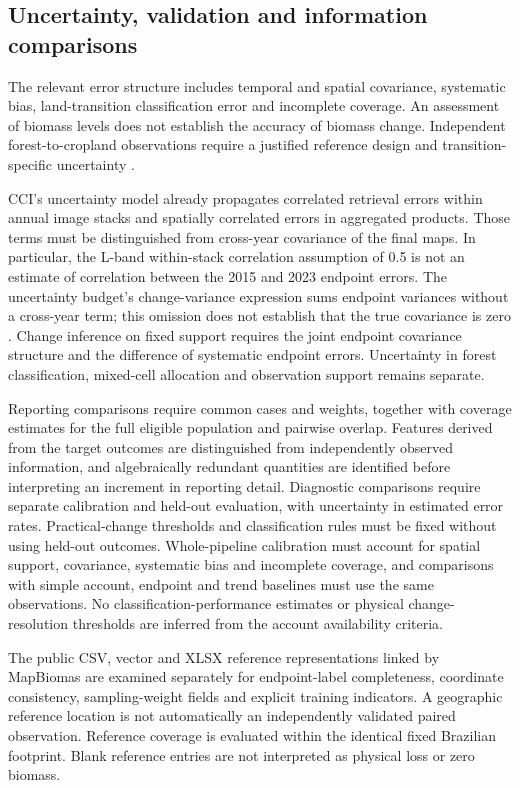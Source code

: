 \documentclass[11pt,a4paper]{article}
\begin{document}
\subsection{Uncertainty, validation and information comparisons}
The relevant error structure includes temporal and spatial covariance, systematic bias, land-transition classification error and incomplete coverage. An assessment of biomass levels does not establish the accuracy of biomass change. Independent forest-to-cropland observations require a justified reference design and transition-specific uncertainty \citep{Olofsson2014}.

CCI's uncertainty model already propagates correlated retrieval errors within annual image stacks and spatially correlated errors in aggregated products. Those terms must be distinguished from cross-year covariance of the final maps. In particular, the L-band within-stack correlation assumption of 0.5 is not an estimate of correlation between the 2015 and 2023 endpoint errors. The uncertainty budget's change-variance expression sums endpoint variances without a cross-year term; this omission does not establish that the true covariance is zero \citep[pp.~14--22, 23--28]{E3UB2025}. Change inference on fixed support requires the joint endpoint covariance structure and the difference of systematic endpoint errors. Uncertainty in forest classification, mixed-cell allocation and observation support remains separate.

Reporting comparisons require common cases and weights, together with coverage estimates for the full eligible population and pairwise overlap. Features derived from the target outcomes are distinguished from independently observed information, and algebraically redundant quantities are identified before interpreting an increment in reporting detail. Diagnostic comparisons require separate calibration and held-out evaluation, with uncertainty in estimated error rates. Practical-change thresholds and classification rules must be fixed without using held-out outcomes. Whole-pipeline calibration must account for spatial support, covariance, systematic bias and incomplete coverage, and comparisons with simple account, endpoint and trend baselines must use the same observations. No classification-performance estimates or physical change-resolution thresholds are inferred from the account availability criteria.

The public CSV, vector and XLSX reference representations linked by MapBiomas are examined separately for endpoint-label completeness, coordinate consistency, sampling-weight fields and explicit training indicators. A geographic reference location is not automatically an independently validated paired observation. Reference coverage is evaluated within the identical fixed Brazilian footprint. Blank reference entries are not interpreted as physical loss or zero biomass.
\end{document}
